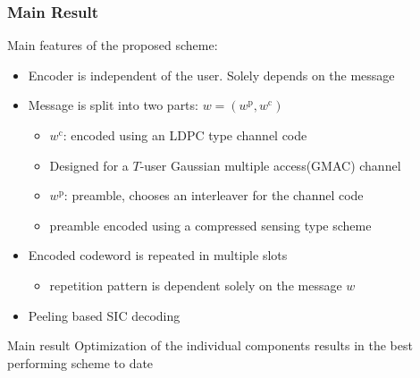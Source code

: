 \documentclass[10pt]{beamer}
\begin{document}
\begin{frame}
\frametitle{Main Result}
Main features of the proposed scheme:
\begin{itemize}
\item Encoder is independent of the user. Solely depends on the message
\pause
\item Message is split into two parts: $w=(w^{\mathrm{p}},w^{\mathrm{c}})$
\pause
	\begin{itemize}
	\item $w^{\mathrm{c}}$: encoded using an LDPC type channel code
	\item Designed for a $T$-user Gaussian multiple access(GMAC) channel
\pause
	\item $w^{\mathrm{p}}$: preamble, chooses an interleaver for the channel code
	\item  preamble encoded using a compressed sensing type scheme
	\end{itemize}
\pause
\item Encoded codeword is repeated in multiple slots
	\begin{itemize}
	\item  repetition pattern is dependent solely on the message $w$
	\end{itemize}
	\pause
\item Peeling based SIC decoding
\end{itemize}
\begin{block}{Main result}
Optimization of the individual components results in the best performing scheme to date
\end{block}
\end{frame}
\end{document}
